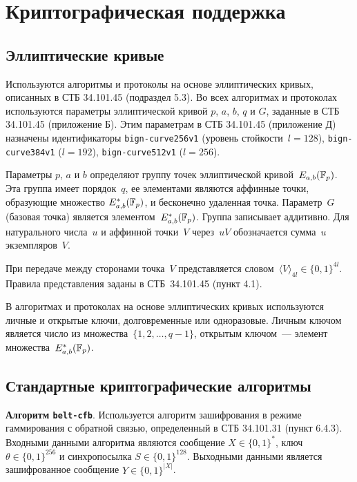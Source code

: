\chapter{Криптографическая поддержка}\label{CRYPTO}

\section{Эллиптические кривые}

Используются алгоритмы и протоколы 
на основе эллиптических кривых, описанных в СТБ 34.101.45 (подраздел 5.3). Во 
всех алгоритмах и протоколах используются параметры эллиптической кривой 
$p$, $a$, $b$, $q$ и $G$, заданные в СТБ 34.101.45 (приложение Б).
Этим параметрам в СТБ 34.101.45 (приложение Д) назначены идентификаторы
\texttt{bign-curve256v1} (уровень стойкости~$l=128$), 
\texttt{bign-curve384v1} ($l=192$), \texttt{bign-curve512v1} ($l=256$).

Параметры $p$, $a$ и $b$ определяют группу точек эллиптической
кривой~$E_{a,b}({\mathbb F}_p)$. Эта группа имеет порядок~$q$, ее элементами
являются аффинные точки, образующие множество $E_{a,b}^*({\mathbb F}_p)$, и
бесконечно удаленная точка. Параметр~$G$ (базовая точка) является
элементом~$E_{a,b}^*({\mathbb F}_p)$. Группа записывает аддитивно. Для натурального
числа~$u$ и аффинной точки~$V$ через~$uV$ обозначается сумма~$u$
экземпляров~$V$.

При передаче между сторонами точка~$V$ представляется 
словом~$\langle V\rangle_{4l}\in\{0,1\}^{4l}$. Правила представления заданы 
в СТБ~34.101.45 (пункт 4.1).

В алгоритмах и протоколах на основе эллиптических кривых используются 
личные и открытые ключи, долговременные или одноразовые. Личным ключом 
является число из множества~$\{1, 2,\ldots, q-1\}$, открытым ключом~--- 
элемент множества~$E_{a,b}^*({\mathbb F}_p)$.

\section{Стандартные криптографические алгоритмы}
\label{CRYPTO.StdAlg}


{\bf Алгоритм \texttt{belt-cfb}}.
Используется алгоритм зашифрования в режиме 
гаммирования с обратной связью, определенный в СТБ 34.101.31 (пункт 
6.4.3). Входными данными алгоритма являются сообщение $X\in\{0,1\}^*$, 
ключ $\theta\in\{0,1\}^{256}$ и синхропосылка $S\in\{0,1\}^{128}$.
Выходными данными является зашифрованное сообщение $Y\in\{0,1\}^{|X|}$.

